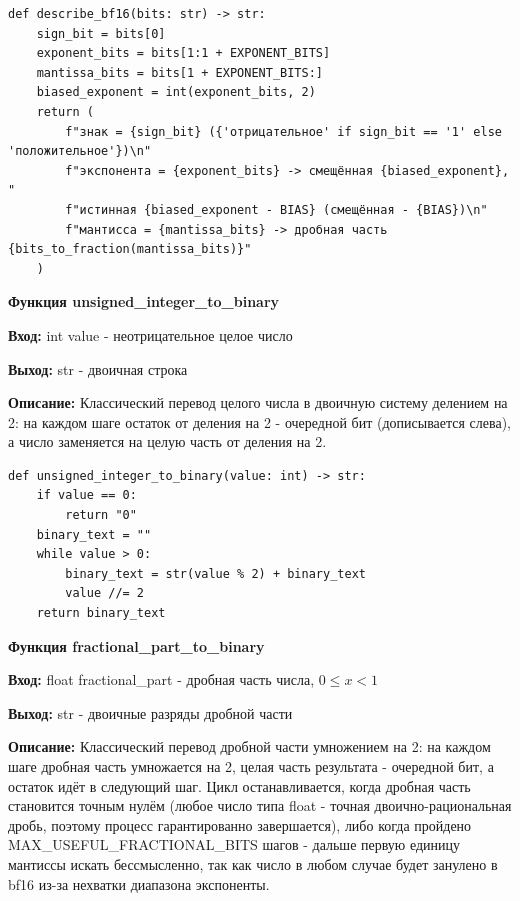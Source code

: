 \begin{lstlisting}[caption=describe\_bf16, label=lst:describe-bf16]
def describe_bf16(bits: str) -> str:
    sign_bit = bits[0]
    exponent_bits = bits[1:1 + EXPONENT_BITS]
    mantissa_bits = bits[1 + EXPONENT_BITS:]
    biased_exponent = int(exponent_bits, 2)
    return (
        f"знак = {sign_bit} ({'отрицательное' if sign_bit == '1' else 'положительное'})\n"
        f"экспонента = {exponent_bits} -> смещённая {biased_exponent}, "
        f"истинная {biased_exponent - BIAS} (смещённая - {BIAS})\n"
        f"мантисса = {mantissa_bits} -> дробная часть {bits_to_fraction(mantissa_bits)}"
    )
\end{lstlisting}

\textbf{Функция unsigned\_integer\_to\_binary } \par
\textbf{Вход:} int value - неотрицательное целое число \par
\textbf{Выход:} str - двоичная строка \par
\textbf{Описание:} Классический перевод целого числа в двоичную систему делением на 2: на каждом шаге остаток от деления на 2 - очередной бит (дописывается слева), а число заменяется на целую часть от деления на 2.\par
\vspace{10pt}

\begin{lstlisting}[caption=unsigned\_integer\_to\_binary, label=lst:unsigned-integer-to-binary]
def unsigned_integer_to_binary(value: int) -> str:
    if value == 0:
        return "0"
    binary_text = ""
    while value > 0:
        binary_text = str(value % 2) + binary_text
        value //= 2
    return binary_text
\end{lstlisting}

\textbf{Функция fractional\_part\_to\_binary } \par
\textbf{Вход:} float fractional\_part - дробная часть числа, $0 \leqslant x < 1$ \par
\textbf{Выход:} str - двоичные разряды дробной части \par
\textbf{Описание:} Классический перевод дробной части умножением на 2: на каждом шаге дробная часть умножается на 2, целая часть результата - очередной бит, а остаток идёт в следующий шаг. Цикл останавливается, когда дробная часть становится точным нулём (любое число типа float - точная двоично-рациональная дробь, поэтому процесс гарантированно завершается), либо когда пройдено MAX\_USEFUL\_FRACTIONAL\_BITS шагов - дальше первую единицу мантиссы искать бессмысленно, так как число в любом случае будет занулено в bf16 из-за нехватки диапазона экспоненты.\par
\vspace{10pt}

